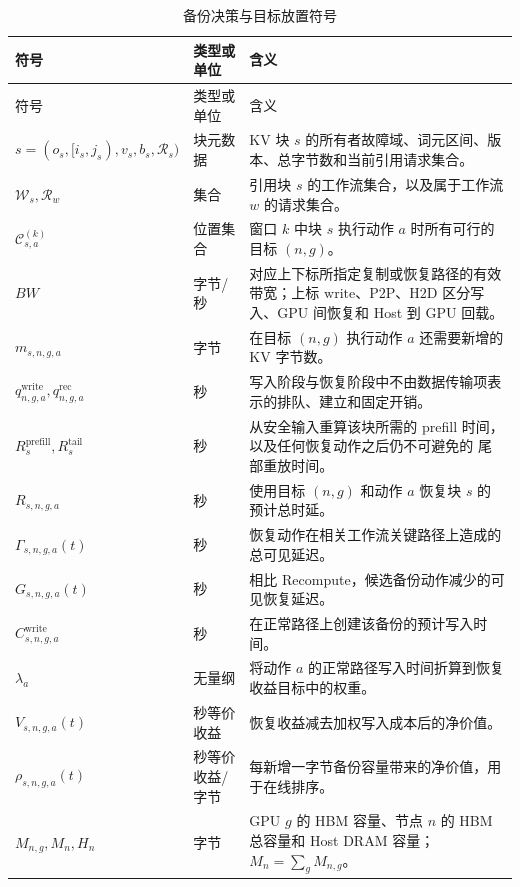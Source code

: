\documentclass[UTF8,11pt,a4paper,fontset=fandol]{ctexart}
\begin{document}
\begin{longtable}{p{}p{}p{}}
  \caption{备份决策与目标放置符号}\label{tab:algorithm2-symbols}\\
  \toprule
  符号 & 类型或单位 & 含义 \\
  \midrule
  \endfirsthead
  \toprule
  符号 & 类型或单位 & 含义 \\
  \midrule
  \endhead
  $s=(o_s,[i_s,j_s),v_s,b_s,\mathcal R_s)$ & 块元数据
    & KV 块 $s$ 的所有者故障域、词元区间、版本、总字节数和当前引用请求集合。 \\
  $\mathcal W_s,\mathcal R_w$ & 集合
    & 引用块 $s$ 的工作流集合，以及属于工作流 $w$ 的请求集合。 \\
  $\mathcal C_{s,a}^{(k)}$ & 位置集合
    & 窗口 $k$ 中块 $s$ 执行动作 $a$ 时所有可行的目标 $(n,g)$。 \\
  $BW$ & 字节/秒
    & 对应上下标所指定复制或恢复路径的有效带宽；上标
      $\mathrm{write}$、$\mathrm{P2P}$、$\mathrm{H2D}$ 区分写入、GPU 间恢复和
      Host 到 GPU 回载。 \\
  $m_{s,n,g,a}$ & 字节
    & 在目标 $(n,g)$ 执行动作 $a$ 还需要新增的 KV 字节数。 \\
  $q_{n,g,a}^{\mathrm{write}},q_{n,g,a}^{\mathrm{rec}}$ & 秒
    & 写入阶段与恢复阶段中不由数据传输项表示的排队、建立和固定开销。 \\
  $R_s^{\mathrm{prefill}},R_s^{\mathrm{tail}}$ & 秒
    & 从安全输入重算该块所需的 prefill 时间，以及任何恢复动作之后仍不可避免的
      尾部重放时间。 \\
  $R_{s,n,g,a}$ & 秒
    & 使用目标 $(n,g)$ 和动作 $a$ 恢复块 $s$ 的预计总时延。 \\
  $\Gamma_{s,n,g,a}(t)$ & 秒
    & 恢复动作在相关工作流关键路径上造成的总可见延迟。 \\
  $G_{s,n,g,a}(t)$ & 秒
    & 相比 Recompute，候选备份动作减少的可见恢复延迟。 \\
  $C_{s,n,g,a}^{\mathrm{write}}$ & 秒
    & 在正常路径上创建该备份的预计写入时间。 \\
  $\lambda_a$ & 无量纲
    & 将动作 $a$ 的正常路径写入时间折算到恢复收益目标中的权重。 \\
  $V_{s,n,g,a}(t)$ & 秒等价收益
    & 恢复收益减去加权写入成本后的净价值。 \\
  $\rho_{s,n,g,a}(t)$ & 秒等价收益/字节
    & 每新增一字节备份容量带来的净价值，用于在线排序。 \\
  $M_{n,g},M_n,H_n$ & 字节
    & GPU $g$ 的 HBM 容量、节点 $n$ 的 HBM 总容量和 Host DRAM 容量；
      $M_n=\sum_gM_{n,g}$。 \\

\end{longtable}
\end{document}
